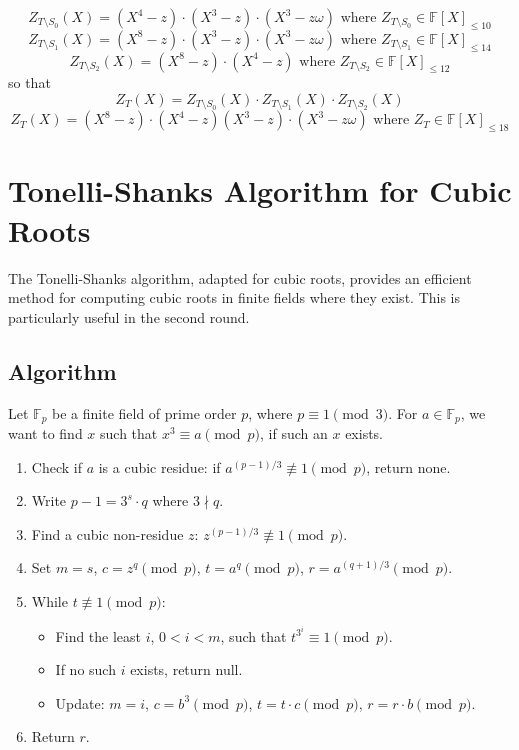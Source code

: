 \documentclass[12pt,a4paper]{article}
\begin{document}
\begin{equation}
Z_{T\setminus S_0}(X) = (X^4-z)\cdot(X^3-z)\cdot(X^3-z\omega) \text{ where } Z_{T\setminus S_0} \in \mathbb{F}[X]_{\leq 10}
\end{equation}
\begin{equation}
Z_{T\setminus S_1}(X) = (X^8-z)\cdot(X^3-z)\cdot(X^3-z\omega) \text{ where } Z_{T\setminus S_1} \in \mathbb{F}[X]_{\leq 14}
\end{equation}
\begin{equation}
Z_{T\setminus S_2}(X) = (X^8-z)\cdot(X^4-z) \text{ where } Z_{T\setminus S_2} \in \mathbb{F}[X]_{\leq 12}
\end{equation}
so that 
\begin{equation}
Z_{T}(X) = Z_{T\setminus S_0}(X) \cdot Z_{T\setminus S_1}(X) \cdot Z_{T\setminus S_2}(X) 
\end{equation}
\begin{equation}
Z_{T}(X) = (X^8-z)\cdot(X^4-z)(X^3-z)\cdot(X^3-z\omega) \text{ where } Z_{T} \in \mathbb{F}[X]_{\leq 18}
\end{equation}

\section{Tonelli-Shanks Algorithm for Cubic Roots}
The Tonelli-Shanks algorithm, adapted for cubic roots, provides an efficient method for computing cubic roots in finite fields where they exist. This is particularly useful in the second round.

\subsection{Algorithm}
Let $\mathbb{F}_p$ be a finite field of prime order $p$, where $p \equiv 1 \pmod{3}$. For $a \in \mathbb{F}_p$, we want to find $x$ such that $x^3 \equiv a \pmod{p}$, if such an $x$ exists.

\begin{enumerate}
    \item Check if $a$ is a cubic residue: if $a^{(p-1)/3} \not\equiv 1 \pmod{p}$, return none.
    \item Write $p-1 = 3^s \cdot q$ where $3 \nmid q$.
    \item Find a cubic non-residue $z$: $z^{(p-1)/3} \not\equiv 1 \pmod{p}$.
    \item Set $m = s$, $c = z^q \pmod{p}$, $t = a^q \pmod{p}$, $r = a^{(q+1)/3} \pmod{p}$.
    \item While $t \not\equiv 1 \pmod{p}$:
        \begin{itemize}
            \item Find the least $i$, $0 < i < m$, such that $t^{3^i} \equiv 1 \pmod{p}$.
            \item If no such $i$ exists, return null.
            \item Update: $m = i$, $c = b^3 \pmod{p}$, $t = t \cdot c \pmod{p}$, $r = r \cdot b \pmod{p}$.
        \end{itemize}
    \item Return $r$.
\end{enumerate}


\end{document}
